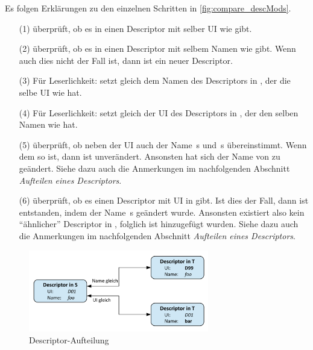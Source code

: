 Es folgen Erklärungen zu den einzelnen Schritten in \autoref{fig:compare_descMods}.
\begin{enumerate}
  \item[(1)] überprüft, ob es in  einen Descriptor mit selber UI wie  gibt.
  \item[(2)] überprüft, ob es in  einen Descriptor mit selbem Namen wie  gibt. Wenn auch dies nicht der Fall ist, dann ist  ein neuer Descriptor.
  \item[(3)] Für Leserlichkeit: setzt  gleich dem Namen des Descriptors in , der die selbe UI wie  hat.
  \item[(4)] Für Leserlichkeit: setzt  gleich der UI des Descriptors in , der den selben Namen wie  hat.
  \item[(5)] überprüft, ob neben der UI auch der Name \,s und \,s übereinstimmt. Wenn dem so ist, dann ist  unverändert. Ansonsten hat sich der Name von  zu  geändert. Siehe dazu auch die Anmerkungen im nachfolgenden Abschnitt \textit{Aufteilen eines Descriptors}.
  \item[(6)] überprüft, ob es einen Descriptor  mit UI  in  gibt. Ist dies der Fall, dann ist  entstanden, indem der Name \,s geändert wurde. Ansonsten existiert also kein "`ähnlicher"' Descriptor in , folglich ist  hinzugefügt wurden. Siehe dazu auch die Anmerkungen im nachfolgenden Abschnitt \textit{Aufteilen eines Descriptors}.
\end{enumerate}

\label{sec:aufteilung_descriptor}

\begin{figure}[h]
\begin{center}
\includegraphics[width=0.7\textwidth]{figs/compare_descSplitting.pdf}
\end{center}
\caption{Descriptor-Aufteilung}
\label{fig:compare_descSplitting}
\end{figure}

